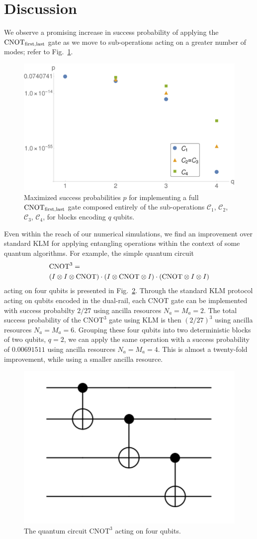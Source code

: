 \documentclass[aps,pra,twocolumn,superscriptaddress,floatfix,10pt]{revtex4}
\begin{document}
 \section{Discussion}
 \label{Section Conclusion}
 We observe a promising increase in success probability of applying the $\mbox{CNOT}_{\rm first,last}$ gate as we move to sub-operations acting on a greater number of modes; refer to Fig.~\ref{Figure - Block Encoding Results}. 
 \begin{figure}[h]
  	\centering
  	\includegraphics[width=0.5 \textwidth]{./blockencodingresults.pdf}
  	\caption{Maximized success probabilities $p$ for implementing a full $\mbox{CNOT}_{\rm first,last}$ gate composed entirely of the sub-operations $\mathcal{C}_1$, $\mathcal{C}_2$, $\mathcal{C}_3$, $\mathcal{C}_4$, for blocks encoding $q$ qubits.}
  	\label{Figure - Block Encoding Results}
  \end{figure}
Even within the reach of our numerical simulations, we find an improvement over standard KLM for applying entangling operations within the context of some quantum algorithms. For example, the simple quantum circuit 
 \begin{eqnarray}
 \small & \mbox{CNOT}^3 = \\ \small \nonumber & (I \otimes I \otimes \mbox{CNOT}) \cdot (I \otimes  \mbox{CNOT} \otimes I) \cdot (\mbox{CNOT} \otimes I \otimes I)
 \end{eqnarray}
 acting on four qubits is presented in Fig.~\ref{Three CNOTs}. Through the standard KLM protocol acting on qubits encoded in the dual-rail, each CNOT gate can be implemented with success probabilty $2/27$ using ancilla resources $N_a=M_a=2$. The total success probability of the $\mbox{CNOT}^3$ gate using KLM is then $(2/27)^3$ using ancilla resources $ N_a=M_a = 6 $. Grouping these four qubits into two deterministic blocks of two qubits, $q=2$, we can apply the same operation with a success probability of $0.00691511$ using ancilla resources $ N_a=M_a=4 $. This is almost a twenty-fold improvement, while using a smaller ancilla resource.
 \begin{figure}[ht]
 	\centering
 	\includegraphics[width=0.25 \textwidth]{./ThreeCNOTs.pdf}
 	\caption{The quantum circuit $\mbox{CNOT}^3$ acting on four qubits.}
 	\label{Three CNOTs}
 \end{figure}
\end{document}
